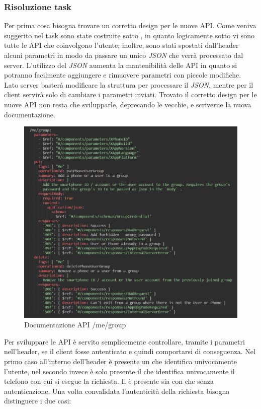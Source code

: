 \documentclass[main.tex]{subfiles}
\begin{document}
\subsubsection{Risoluzione task}
Per prima cosa bisogna trovare un corretto design per le nuove API. Come veniva suggerito nel task sono state costruite sotto , in quanto logicamente sotto  vi sono tutte le API che coinvolgono l'utente; inoltre, sono stati spostati dall'header alcuni parametri in modo da passare un unico \emph{JSON} che verrà processato dal server. L'utilizzo del \emph{JSON} aumenta la mantenibilità delle API in quanto si potranno facilmente aggiungere e rimuovere parametri con piccole modifiche. Lato server basterà modificare la struttura per processare il \emph{JSON}, mentre per il client servirà solo di cambiare i parametri inviati.\newline
Trovato il corretto design per le nuove API non resta che svilupparle, deprecando le vecchie, e scriverne la nuova documentazione.
\begin{figure}[H]
    \centering
    \includegraphics[width=1\linewidth]{img/redesign-api-task/redesign-api-swagger-user-phone-new.PNG}
    \caption{Documentazione API /me/group}
    \label{fig:redesign-api-swagger-user-phone-new}
\end{figure}
Per sviluppare le API è servito semplicemente controllare, tramite i parametri nell'header, se il client fosse autenticato e quindi comportarsi di conseguenza. Nel primo caso all'interno dell'header è presente un  che identifica univocamente l'utente, nel secondo invece è solo presente il  che identifica univocamente il telefono con cui si esegue la richiesta. Il  è presente sia con che senza autenticazione. Una volta convalidata l'autenticità della richiesta bisogna distinguere i due casi:
\end{document}
